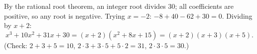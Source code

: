 By the rational root theorem, an integer root divides $30$; all coefficients are positive, so any root is negative. Trying $x=-2$: $-8+40-62+30=0$. Dividing by $x+2$:
\[x^3+10x^2+31x+30=(x+2)\left(x^2+8x+15\right)=\boxed{(x+2)(x+3)(x+5)}.\]
(Check: $2+3+5=10$, $2\cdot3+3\cdot5+5\cdot2=31$, $2\cdot3\cdot5=30$.)
